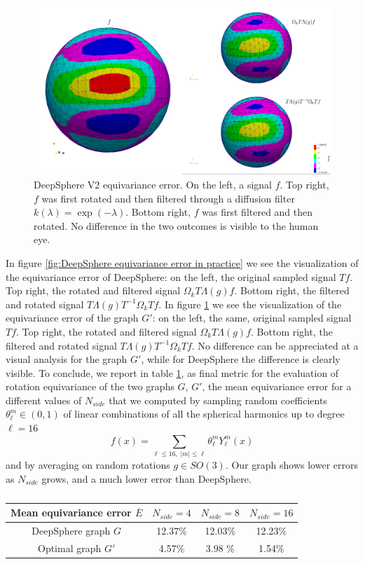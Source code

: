 \begin{figure}[h!]
	\centering
	\includegraphics[width=\textwidth]{../codes/06.Equivariance_error/img_example_thresholdedHKGL/thresholdedHKGL.png}	
	\caption{\label{fig:Optimal equivariance error in practice}DeepSphere V2 equivariance error. On the left, a signal $f$. Top right, $f$ was first rotated and then filtered through a diffusion filter $k(\lambda) = \exp (-\lambda)$. Bottom right, $f$ was first filtered and then rotated. No difference in the two outcomes is visible to the human eye.}
\end{figure}

In figure \ref{fig:DeepSphere equivariance error in practice} we see the visualization of the equivariance error of DeepSphere: on the left, the original sampled signal $Tf$. Top right, the rotated and filtered signal $\Omega_k T \Lambda(g) f$. Bottom right, the filtered and rotated signal $T \Lambda(g) T^{-1} \Omega_k T f $. In figure \ref{fig:Optimal equivariance error in practice} we see the visualization of the equivariance error of the graph $G'$: on the left, the same, original sampled signal $Tf$. Top right, the rotated and filtered signal $\Omega_k T \Lambda(g) f$. Bottom right, the filtered and rotated signal $T \Lambda(g) T^{-1} \Omega_k T f $. No difference can be appreciated at a visual analysis for the graph $G'$, while for DeepSphere the difference is clearly visible.
\clearpage
To conclude, we report in table \ref{tab:final results}, as final metric for the evaluation of rotation equivariance of the two graphs $G$, $G'$, the mean equivariance error for a different values of $N_{side}$ that we computed by sampling random coefficients $\theta_\ell^m \in(0,1)$ of linear combinations of all the spherical harmonics up to degree $\ell=16$
$$f(x) = \sum_{\ell\leq 16,\ |m|\leq\ell}\theta_\ell^m Y_\ell^m(x)
$$
and by averaging on random rotations $g\in SO(3)$. Our graph shows lower errors as $N_{side}$ grows, and a much lower error than DeepSphere.

\begin{table}
		\centering
\begin{tabular}{c|ccc}
	Mean equivariance error $\overline{E}$& $N_{side}=4$& $N_{side}=8$&$N_{side}=16$ \\\hline
	DeepSphere graph $G$ & 12.37\% & 12.03\% & 12.23\% \\
	Optimal graph $G'$ & 4.57\% & 3.98 \% & 1.54\%
\end{tabular}
\caption{\label{tab:final results}}
\end{table}

